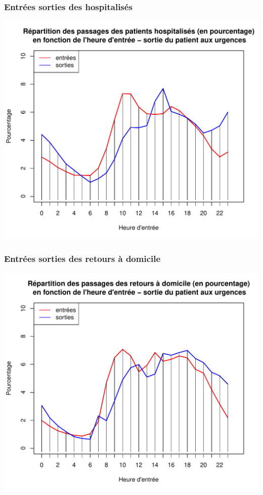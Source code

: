 \documentclass[12pt,english,french,twoside]{book}\usepackage[]{graphicx}\usepackage[]{color}
\makeatletter
\def\maxwidth{ %
  \ifdim\Gin@nat@width>\linewidth
    \linewidth
  \else
    \Gin@nat@width
  \fi
}
\newenvironment{knitrout}{}{} %
\makeatother
\begin{document}
\subsubsection*{Entrées sorties des hospitalisés}

\begin{knitrout}
\color{fgcolor}
\includegraphics[width=\maxwidth]{figure/es_hospitalise} 

\end{knitrout}


\subsubsection*{Entrées sorties des retours à domicile}

\begin{knitrout}
\color{fgcolor}
\includegraphics[width=\maxwidth]{figure/es_dom} 

\end{knitrout}
\end{document}
